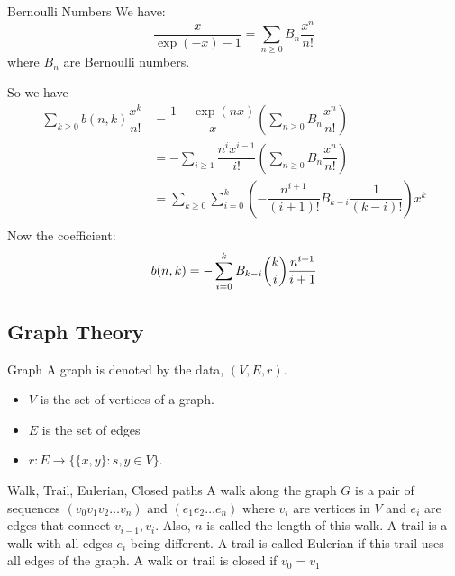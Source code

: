 \documentclass{report}
\begin{document}
\begin{definition}{Bernoulli Numbers}
    We have:
        \begin{equation*}
            \dfrac{x}{\exp(-x) - 1} = \sum_{n \geq 0}B_{n}\dfrac{x^{n}}{n!}
        \end{equation*}
    where $B_{n}$ are Bernoulli numbers.
\end{definition}

So we have
    \begin{align*}
        \sum_{k \geq 0}b(n, k)\dfrac{x^{k}}{n!} &= \dfrac{1 - \exp(nx)}{x}\left(\sum_{n \geq 0}B_{n}\dfrac{x^{n}}{n!}\right)                                 \\
                                                &= -\sum_{i \geq 1}\dfrac{n^{i}x^{i - 1}}{i!}\left(\sum_{n \geq 0}B_{n}\dfrac{x^{n}}{n!}\right)              \\
                                                &= \sum_{k \geq 0}\sum_{i = 0}^{k}\left(-\dfrac{n^{i + 1}}{(i + 1)!}B_{k - i}\dfrac{1}{(k - i)!}\right)x^{k} \\
    \end{align*}
Now the coefficient:
    \begin{equation*}
        b(n, k) = -\sum_{i = 0}^{k}B_{k - i}\dbinom{k}{i}\dfrac{n^{i + 1}}{i + 1}
    \end{equation*}

\begin{topic}
    \section{Graph Theory}
\end{topic}

\begin{definition}{Graph}
    A graph is denoted by the data, $(V, E, r)$. 
        \begin{itemize}
            \item $V$ is the set of vertices of a graph.

            \item $E$ is the set of edges

            \item $r : E \rightarrow \{\{x, y\} : s, y \in V\}$. 
        \end{itemize}
\end{definition}

\begin{definition}{Walk, Trail, Eulerian, Closed paths}
    A walk along the graph $G$ is a pair of sequences $(v_{0}v_{1}v_{2}\ldots v_{n})$ and $(e_{1}e_{2}\ldots e_{n})$ where $v_{i}$ are vertices in $V$ and $e_{i}$ are edges that connect $v_{i - 1}, v_{i}$. Also, $n$ is called the length of this walk. A trail is a walk with all edges $e_{i}$ being different. A trail is called Eulerian if this trail uses all edges of the graph. A walk or trail is closed if $v_{0} = v_{1}$
\end{definition}
\end{document}
